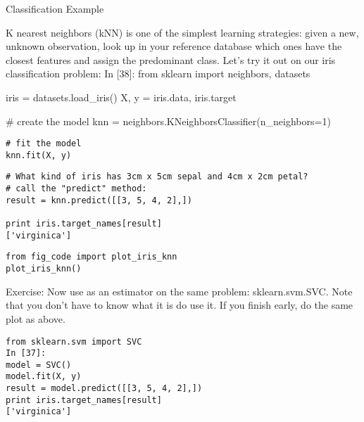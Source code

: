 
Classification Example

K nearest neighbors (kNN) is one of the simplest learning strategies: given a new, unknown observation, look up in your reference database which ones have the closest features and assign the predominant class.
Let's try it out on our iris classification problem:
In [38]:
from sklearn import neighbors, datasets

iris = datasets.load_iris()
X, y = iris.data, iris.target

# create the model
knn = neighbors.KNeighborsClassifier(n_neighbors=1)


\begin{framed}
\begin{verbatim}
# fit the model
knn.fit(X, y)

\end{verbatim}
\end{framed}
\begin{framed}
\begin{verbatim}
# What kind of iris has 3cm x 5cm sepal and 4cm x 2cm petal?
# call the "predict" method:
result = knn.predict([[3, 5, 4, 2],])

print iris.target_names[result]
['virginica']
\end{verbatim}
\end{framed}
\begin{framed}
\begin{verbatim}
from fig_code import plot_iris_knn
plot_iris_knn()
\end{verbatim}
\end{framed}
Exercise: Now use as an estimator on the same problem: sklearn.svm.SVC.
Note that you don't have to know what it is do use it.
If you finish early, do the same plot as above.

\begin{framed}
\begin{verbatim}
from sklearn.svm import SVC
In [37]:
model = SVC()
model.fit(X, y)
result = model.predict([[3, 5, 4, 2],])
print iris.target_names[result]
['virginica']
\end{verbatim}
\end{framed}
